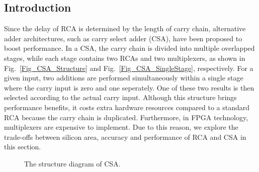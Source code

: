 \documentclass[prodmode,acmtrets]{acmsmall} %
\begin{document}
\subsection{Introduction}
Since the delay of RCA is determined by the length of carry chain, alternative adder architectures, such as carry select adder (CSA), have been proposed to boost performance. In a CSA, the carry chain is divided into multiple overlapped stages, while each stage contains two RCAs and two multiplexers, as shown in Fig.~\ref{Fig_CSA_Structure} and Fig.~\ref{Fig_CSA_SingleStage}, respectively. For a given input, two additions are performed simultaneously within a single stage where the carry input is zero and one seperately. One of these two results is then selected according to the actual carry input. Although this structure brings performance benefits, it costs extra hardware resources compared to a standard RCA because the carry chain is duplicated. Furthermore, in FPGA technology, multiplexers are expensive to implement. Due to this reason, we explore the trade-offs between silicon area, accuracy and performance of RCA and CSA in this section.
\begin{figure}[htbp]
        \centering
    \caption{The structure diagram of CSA.}
\end{figure}
\end{document}
